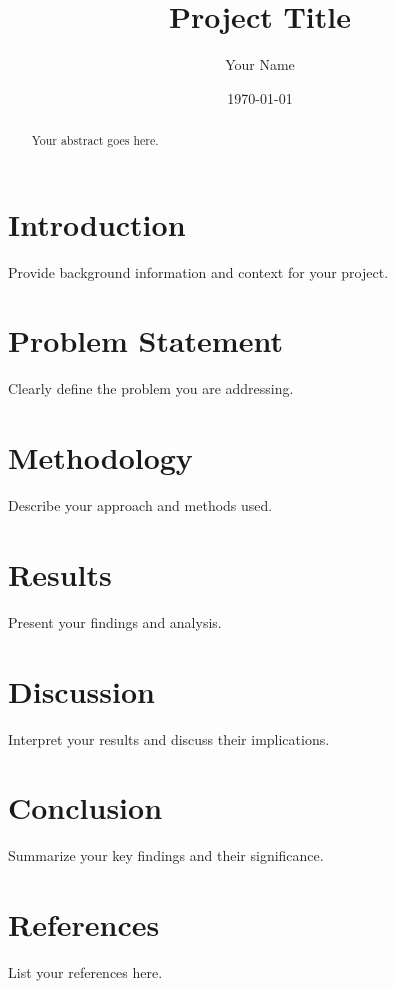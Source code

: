 \documentclass[12pt]{article}
\title{Project Title}
\author{Your Name}
\date{\today}
\begin{document}
\maketitle

\begin{abstract}
Your abstract goes here. 
\end{abstract}

\section{Introduction}
Provide background information and context for your project.

\section{Problem Statement}
Clearly define the problem you are addressing.

\section{Methodology}
Describe your approach and methods used.

\section{Results}
Present your findings and analysis.

\section{Discussion}
Interpret your results and discuss their implications.

\section{Conclusion}
Summarize your key findings and their significance.

\section{References}
List your references here.
\end{document}
